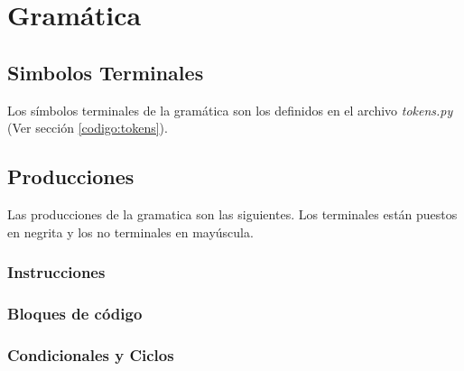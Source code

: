 \section{Gramática}
\label{sec:gramatica}

\subsection{Simbolos Terminales}
	Los símbolos terminales de la gramática son los definidos en el archivo 
	\textit{tokens.py} (Ver sección \ref{codigo:tokens}).

\subsection{Producciones}
	Las producciones de la gramatica son las siguientes. Los terminales
	están puestos en negrita y los no terminales en mayúscula.
\newToken{\SEMICOLON}{;}
\newToken{\LPARENT}{(}
\newToken{\RPARENT}{)}
\newToken{\LBRACKET}{[}
\newToken{\RBRACKET}{]}
\newToken{\LBRACE}{\{}
\newToken{\RBRACE}{\}}
\newToken{\ADD}{+}
\newToken{\MULT}{*}
\newToken{\COMMA}{,}
\subsubsection{Instrucciones}
\begin{reglas}
\end{reglas}
\subsubsection{Bloques de código}
\begin{reglas}
\end{reglas}
\subsubsection{Condicionales y Ciclos}
\begin{reglas}
	\\
\end{reglas}
